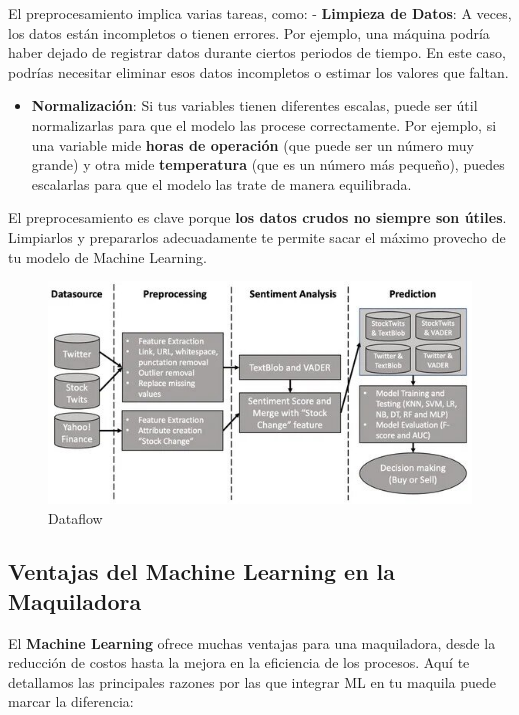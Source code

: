 \documentclass[
  10pt,
  letterpaper,
]{book}
\providecommand{\tightlist}{%
  \setlength{\itemsep}{0pt}\setlength{\parskip}{0pt}}\usepackage{longtable,booktabs,array}
\begin{document}
El preprocesamiento implica varias tareas, como: - \textbf{Limpieza de
Datos}: A veces, los datos están incompletos o tienen errores. Por
ejemplo, una máquina podría haber dejado de registrar datos durante
ciertos periodos de tiempo. En este caso, podrías necesitar eliminar
esos datos incompletos o estimar los valores que faltan.

\begin{itemize}
\tightlist
\item
  \textbf{Normalización}: Si tus variables tienen diferentes escalas,
  puede ser útil normalizarlas para que el modelo las procese
  correctamente. Por ejemplo, si una variable mide \textbf{horas de
  operación} (que puede ser un número muy grande) y otra mide
  \textbf{temperatura} (que es un número más pequeño), puedes escalarlas
  para que el modelo las trate de manera equilibrada.
\end{itemize}

El preprocesamiento es clave porque \textbf{los datos crudos no siempre
son útiles}. Limpiarlos y prepararlos adecuadamente te permite sacar el
máximo provecho de tu modelo de Machine Learning.

\begin{figure}[H]

{\centering \includegraphics{Img/datasource.jpg}

}

\caption{Dataflow}

\end{figure}%

\subsection{Ventajas del Machine Learning en la
Maquiladora}\label{ventajas-del-machine-learning-en-la-maquiladora}

El \textbf{Machine Learning} ofrece muchas ventajas para una
maquiladora, desde la reducción de costos hasta la mejora en la
eficiencia de los procesos. Aquí te detallamos las principales razones
por las que integrar ML en tu maquila puede marcar la diferencia:
\end{document}
